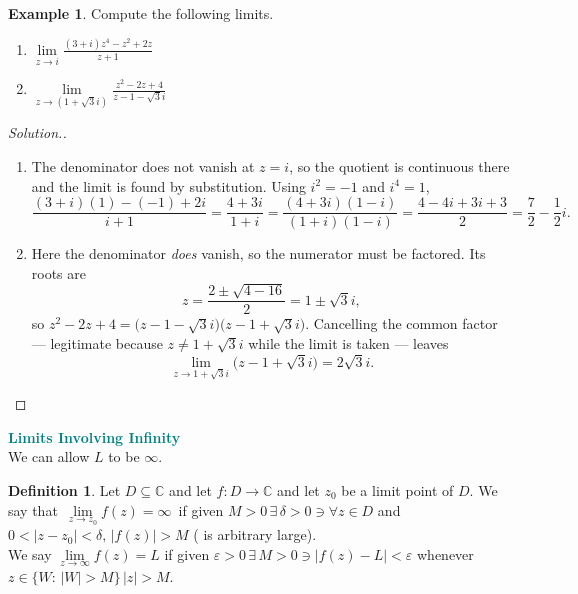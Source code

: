 \documentclass[11pt,a4paper]{article}
\theoremstyle{definition}
\newtheorem{definition}[thm]{Definition}
\newtheorem{example}[thm]{Example}
\newenvironment{solution}
  {\renewcommand{\qedsymbol}{}\begin{proof}[\textit{Solution}.]}
  {\end{proof}}
\begin{document}
\begin{example}
Compute the following limits.
\begin{enumerate}
\item $\displaystyle{\lim\limits_{z \rightarrow i}\frac{(3 + i)z^4 - z^2 + 2z}{z + 1}}$
\item $\displaystyle{\lim\limits_{z \rightarrow (1 + \sqrt{3}i)} \frac{z^2 - 2z + 4}{z - 1 -\sqrt{3}i}}$
\end{enumerate}
\end{example}
\begin{solution}
\begin{enumerate}
\item The denominator does not vanish at $z=i$, so the quotient is continuous
there and the limit is found by substitution. Using $i^2=-1$ and $i^4=1$,
$$\frac{(3+i)(1)-(-1)+2i}{i+1}=\frac{4+3i}{1+i}
=\frac{(4+3i)(1-i)}{(1+i)(1-i)}=\frac{4-4i+3i+3}{2}=\frac{7}{2}-\frac{1}{2}i .$$

\item Here the denominator \emph{does} vanish, so the numerator must be
factored. Its roots are
$$z=\frac{2\pm\sqrt{4-16}}{2}=1\pm\sqrt{3}i ,$$
so $z^2-2z+4=\big(z-1-\sqrt{3}i\big)\big(z-1+\sqrt{3}i\big)$. Cancelling the
common factor --- legitimate because $z\neq 1+\sqrt3 i$ while the limit is
taken --- leaves
$$\lim_{z\rightarrow 1+\sqrt{3}i}\big(z-1+\sqrt{3}i\big)=2\sqrt{3}i .$$
\end{enumerate}
\end{solution}

\textbf{\textcolor{teal}{Limits Involving Infinity}}\\
We can allow $L$ to be $\infty$.\\



\begin{definition}
Let $D\subseteq \mathbb{C}$ and let $f: D\longrightarrow \mathbb{C}$ and let $z_0$ be a limit point of $D$. We say that $\,\displaystyle{\lim\limits_{z\rightarrow z_0} f(z) = \infty}\,$ if given $M> 0 \,\exists \,\delta > 0 \ni \forall z \in D$ and $0 < \left|z - z_0\right| < \delta,\, \left|f(z)\right|> M$ ( is arbitrary large).\\

We say $\displaystyle{\lim\limits_{z\rightarrow \infty} f(z) = L}$ if given $\varepsilon > 0\,\exists\, M> 0 \ni \left|f(z) - L\right| < \varepsilon$ whenever\\ $z \in \big\{W:\,\left|W\right|> M\big\}\,\left|z\right| > M$.
\end{definition}
\end{document}
